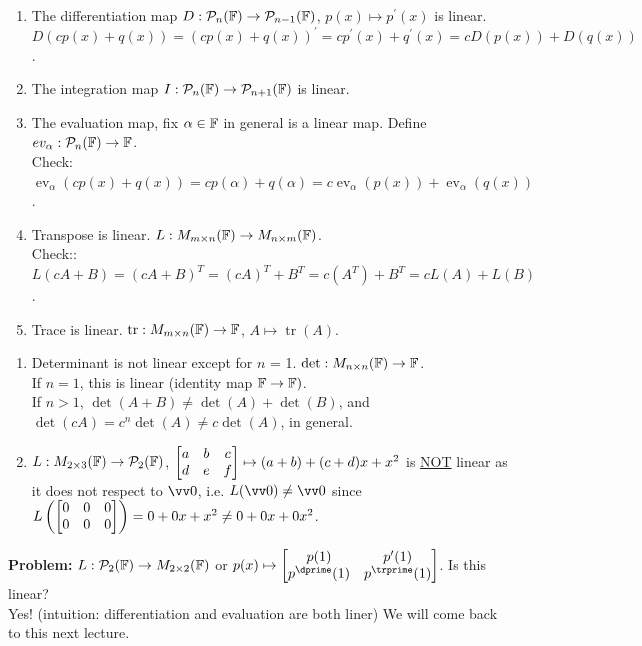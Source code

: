 \begin{example}
    \phantom{}
    \begin{enumerate}
        \item The differentiation map $D:\mathcal{P}_n({\mathbb{F}}) \to \mathcal{P}_{n-1}({\mathbb{F}})$, $p(x)\mapsto p^\prime(x)$ is linear. $D(cp(x)+q(x)) = (cp(x)+q(x))^\prime = cp^\prime(x) + q^\prime(x) = cD(p(x)) + D(q(x))$. 
        \item The integration map $I: \mathcal{P}_n({\mathbb{F}}) \to \mathcal{P}_{n+1}({\mathbb{F}})$ is linear. 
        \item The evaluation map, fix $\alpha \in {\mathbb{F}}$ in general is a linear map. Define $ev_\alpha : \mathcal{P}_n({\mathbb{F}})\to {\mathbb{F}}$. \\
        Check: $\operatorname{ev}_\alpha(cp(x)+q(x)) = cp(\alpha) + q(\alpha) = c\operatorname{ev}_\alpha(p(x)) + \operatorname{ev}_\alpha(q(x))$.
        \item Transpose is linear. $L:M_{m \times n}({\mathbb{F}}) \to M_{n \times m}({\mathbb{F}})$. \\
        Check:: $L(cA + B) = (cA+B)^T = (cA)^T + B^T = c(A^T) + B^T = cL(A) + L(B)$.
        \item Trace is linear. $\operatorname{tr}:M_{m \times n}({\mathbb{F}}) \to {\mathbb{F}}$, $A \mapsto \operatorname{tr}(A)$.
    \end{enumerate}
\end{example}

\begin{example}
    \phantom{}
    \begin{enumerate}
        \item Determinant is not linear except for $n$ = 1. $\operatorname{det}:M_{n \times n}({\mathbb{F}})\to {\mathbb{F}}$. \\
        If $n = 1$, this is linear (identity map ${\mathbb{F}} \to {\mathbb{F}})$. \\
        If $n > 1$, $\det(A+B) \neq \det(A) + \det(B)$, and $\det(cA) = c^n\det(A) \neq c\det(A)$, in general. 
        \item $L:M_{2 \times 3}({\mathbb{F}}) \to \mathcal{P}_2({\mathbb{F}})$, $\begin{bmatrix} a & b & c \\ d & e & f \end{bmatrix} \mapsto (a+b) + (c+d)x + x^2$ is \underline{NOT} linear as it does not respect to $\vzero$, i.e. $L(\vzero) \neq \vzero$
        since $L\left( \begin{bmatrix} 0 & 0 & 0 \\ 0 & 0 & 0 \end{bmatrix} \right) = 0 + 0x + x^2 \neq 0 + 0x + 0x^2$. 
    \end{enumerate}
\end{example}

\textbf{Problem:} $L:\mathcal{P}_2({\mathbb{F}}) \to M_{2 \times 2}({\mathbb{F}})$ or $p(x) \mapsto \cv{p(1) & p^\prime(1) \\ p^\dprime(1) & p^\trprime(1)}$.
Is this linear? \\
Yes! (intuition: differentiation and evaluation are both liner) We will come back to this next lecture.


